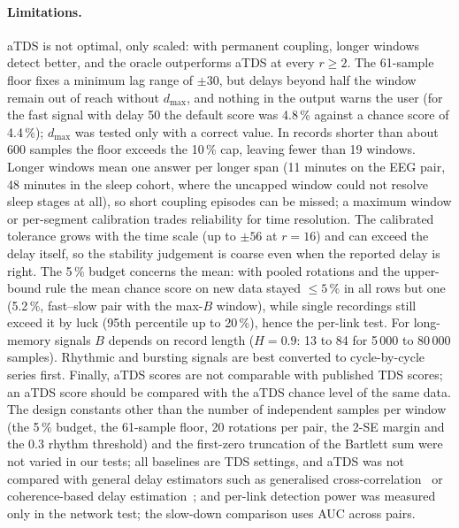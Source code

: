 \documentclass[11pt,a4paper]{article}
\begin{document}
\paragraph{Limitations.} aTDS is not optimal, only scaled: with permanent coupling, longer windows detect better, and the oracle outperforms aTDS at every $r \ge 2$. The 61-sample floor fixes a minimum lag range of $\pm30$, but delays beyond half the window remain out of reach without $d_{\max}$, and nothing in the output warns the user (for the fast signal with delay 50 the default score was 4.8\,\% against a chance score of 4.4\,\%); $d_{\max}$ was tested only with a correct value. In records shorter than about 600 samples the floor exceeds the 10\,\% cap, leaving fewer than 19 windows. Longer windows mean one answer per longer span (11 minutes on the EEG pair, 48 minutes in the sleep cohort, where the uncapped window could not resolve sleep stages at all), so short coupling episodes can be missed; a maximum window or per-segment calibration trades reliability for time resolution. The calibrated tolerance grows with the time scale (up to $\pm56$ at $r = 16$) and can exceed the delay itself, so the stability judgement is coarse even when the reported delay is right. The 5\,\% budget concerns the mean: with pooled rotations and the upper-bound rule the mean chance score on new data stayed $\le 5\,\%$ in all rows but one (5.2\,\%, fast--slow pair with the max-$B$ window), while single recordings still exceed it by luck (95th percentile up to 20\,\%), hence the per-link test. For long-memory signals $B$ depends on record length ($H = 0.9$: 13 to 84 for 5\,000 to 80\,000 samples). Rhythmic and bursting signals are best converted to cycle-by-cycle series first. Finally, aTDS scores are not comparable with published TDS scores; an aTDS score should be compared with the aTDS chance level of the same data. The design constants other than the number of independent samples per window (the 5\,\% budget, the 61-sample floor, 20 rotations per pair, the 2-SE margin and the 0.3 rhythm threshold) and the first-zero truncation of the Bartlett sum were not varied in our tests; all baselines are TDS settings, and aTDS was not compared with general delay estimators such as generalised cross-correlation~\cite{Knapp1976GeneralizedCorrelation} or coherence-based delay estimation~\cite{Carter1987CoherenceTime}; and per-link detection power was measured only in the network test; the slow-down comparison uses AUC across pairs.
\end{document}
